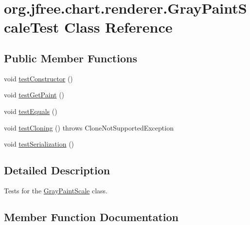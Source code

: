 \hypertarget{classorg_1_1jfree_1_1chart_1_1renderer_1_1_gray_paint_scale_test}{}\section{org.\+jfree.\+chart.\+renderer.\+Gray\+Paint\+Scale\+Test Class Reference}
\label{classorg_1_1jfree_1_1chart_1_1renderer_1_1_gray_paint_scale_test}
\subsection*{Public Member Functions}
\begin{DoxyCompactItemize}
\item 
void \mbox{\hyperlink{classorg_1_1jfree_1_1chart_1_1renderer_1_1_gray_paint_scale_test_aeb82d0ee0a846e557d52d19bc37ae67a}{test\+Constructor}} ()
\item 
void \mbox{\hyperlink{classorg_1_1jfree_1_1chart_1_1renderer_1_1_gray_paint_scale_test_a85acbc07ac5d862a5519f0624aded18c}{test\+Get\+Paint}} ()
\item 
void \mbox{\hyperlink{classorg_1_1jfree_1_1chart_1_1renderer_1_1_gray_paint_scale_test_a8dffba489559ea1b6336772c61e22cc2}{test\+Equals}} ()
\item 
void \mbox{\hyperlink{classorg_1_1jfree_1_1chart_1_1renderer_1_1_gray_paint_scale_test_a2596f1177541e1ca0430168d1d14d2ce}{test\+Cloning}} ()  throws Clone\+Not\+Supported\+Exception 
\item 
void \mbox{\hyperlink{classorg_1_1jfree_1_1chart_1_1renderer_1_1_gray_paint_scale_test_a5408a0b780c1ce37f3f126800f59b4db}{test\+Serialization}} ()
\end{DoxyCompactItemize}


\subsection{Detailed Description}
Tests for the \mbox{\hyperlink{classorg_1_1jfree_1_1chart_1_1renderer_1_1_gray_paint_scale}{Gray\+Paint\+Scale}} class. 

\subsection{Member Function Documentation}
\mbox{\label{classorg_1_1jfree_1_1chart_1_1renderer_1_1_gray_paint_scale_test_a2596f1177541e1ca0430168d1d14d2ce}} 
